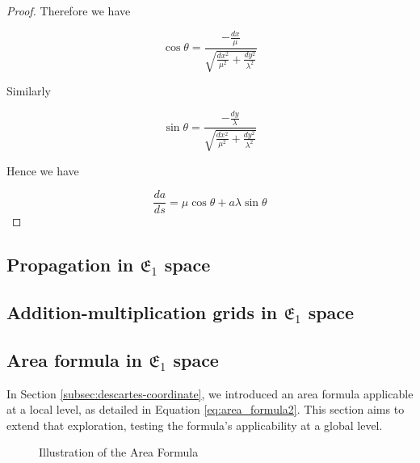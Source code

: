 \begin{proof}
Therefore we have

$$
\cos \theta = \frac{-\frac{dx}{\mu}}{\sqrt{\frac{dx^2}{\mu^2} + \frac{dy^2}{\lambda^2}}}
$$

Similarly

$$
\sin \theta = \frac{-\frac{dy}{\lambda}}{\sqrt{\frac{dx^2}{\mu^2} + \frac{dy^2}{\lambda^2}}}
$$

Hence we have

$$
\frac{da}{ds} = \mu \cos \theta + a \lambda \sin \theta
$$

\end{proof}

\subsection{Propagation in $\mathfrak{E}_1$ space}\label{subsec:propgation}

\subsection{Addition-multiplication grids in $\mathfrak{E}_1$ space}\label{subsec:grids}

\subsection{Area formula in $\mathfrak{E}_1$ space}

In Section \ref{subsec:descartes-coordinate}, we introduced an area formula applicable at a local level, as detailed in Equation \eqref{eq:area_formula2}.
This section aims to extend that exploration, testing the formula's applicability at a global level.

\begin{figure}[ht]
    \centering
    \caption{Illustration of the Area Formula}\label{fig:area-formula}
\end{figure}

